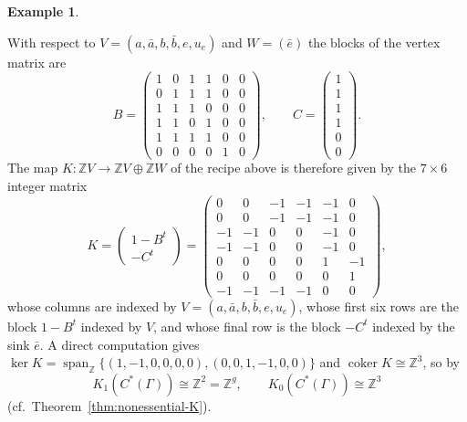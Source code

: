 \documentclass[12pt,reqno]{amsart}
\theoremstyle{plain}
\theoremstyle{definition}
\newtheorem{example}[theorem]{Example}
\newcommand{\Z}{\mathbb{Z}}
\newcommand{\coker}{\operatorname{coker}}
\begin{document}
\begin{example}
\begin{center}
\end{center}
With respect to $V=(a,\bar a,b,\bar b,e,u_e)$ and $W=(\bar e)$ the blocks of the vertex matrix are
\[
B=\begin{pmatrix}
1&0&1&1&0&0\\
0&1&1&1&0&0\\
1&1&1&0&0&0\\
1&1&0&1&0&0\\
1&1&1&1&0&0\\
0&0&0&0&1&0
\end{pmatrix},
\qquad
C=\begin{pmatrix} 1\\1\\1\\1\\0\\0\end{pmatrix}.
\]
The map $K\colon\Z V\to\Z V\oplus\Z W$ of the recipe above is therefore given by the $7\times 6$
integer matrix
\[
K=\begin{pmatrix}1-B^{t}\\ -C^{t}\end{pmatrix}
=\begin{pmatrix}
0&0&-1&-1&-1&0\\
0&0&-1&-1&-1&0\\
-1&-1&0&0&-1&0\\
-1&-1&0&0&-1&0\\
0&0&0&0&1&-1\\
0&0&0&0&0&1\\
-1&-1&-1&-1&0&0
\end{pmatrix},
\]
whose columns are indexed by $V=(a,\bar a,b,\bar b,e,u_e)$, whose first six rows are the block
$1-B^{t}$ indexed by $V$, and whose final row is the block $-C^{t}$ indexed by the sink $\bar e$.
A direct computation gives
$\ker K=\operatorname{span}_\Z\{(1,-1,0,0,0,0),(0,0,1,-1,0,0)\}$ and $\coker K\cong\Z^{3}$, so by
\cite[Theorem~3.2]{RS}
\[
K_1(C^*(\Gamma))\cong\Z^{2}=\Z^{g},\qquad K_0(C^*(\Gamma))\cong\Z^{3}
\]
(cf.\ Theorem~\ref{thm:nonessential-K}).
\end{example}
\end{document}
